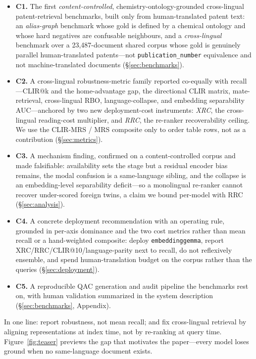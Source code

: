 \documentclass[11pt]{article}
\begin{document}
\begin{itemize}
  \item \textbf{C1.} The first \emph{content-controlled},
  chemistry-ontology-grounded cross-lingual patent-retrieval benchmarks, built
  only from human-translated patent text: an \emph{alias-graph} benchmark whose
  gold is defined by a chemical ontology and whose hard negatives are confusable
  neighbours, and a \emph{cross-lingual} benchmark over a 23{,}487-document
  shared corpus whose gold is genuinely parallel human-translated patents---not
  \texttt{publication\_number} equivalence and not machine-translated documents
  (\S\ref{sec:benchmarks}).
  \item \textbf{C2.} A cross-lingual robustness-metric family reported
  co-equally with recall---CLIR@k and the home-advantage gap, the directional
  CLIR matrix, mate-retrieval, cross-lingual RBO, language-collapse, and
  embedding separability AUC---anchored by two new deployment-cost instruments:
  \emph{XRC}, the cross-lingual reading-cost multiplier, and \emph{RRC}, the
  re-ranker recoverability ceiling. We use the CLIR-MRS / MRS composite only to
  order table rows, not as a contribution (\S\ref{sec:metrics}).
  \item \textbf{C3.} A mechanism finding, confirmed on a content-controlled
  corpus and made falsifiable: availability sets the stage but a residual
  encoder bias remains, the modal confusion is a same-language sibling, and the
  collapse is an embedding-level separability deficit---so a monolingual
  re-ranker cannot recover under-scored foreign twins, a claim we bound
  per-model with RRC (\S\ref{sec:analysis}).
  \item \textbf{C4.} A concrete deployment recommendation with an operating
  rule, grounded in per-axis dominance and the two cost metrics rather than mean
  recall or a hand-weighted composite: deploy \texttt{embeddinggemma}, report
  XRC/RRC/CLIR@10/language-parity next to recall, do not reflexively ensemble,
  and spend human-translation budget on the corpus rather than the queries
  (\S\ref{sec:deployment}).
  \item \textbf{C5.} A reproducible QAC generation and audit pipeline the
  benchmarks rest on, with human validation summarized in the system
  description (\S\ref{sec:benchmarks}, Appendix).
\end{itemize}

In one line: report robustness, not mean recall; and fix cross-lingual
retrieval by aligning representations at index time, not by re-ranking at query
time. Figure~\ref{fig:teaser} previews the gap that motivates the paper---every
model loses ground when no same-language document exists.
\end{document}
